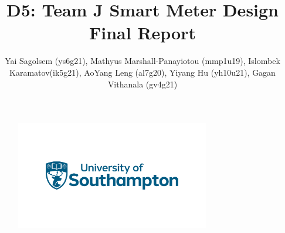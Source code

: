 \documentclass[9pt, technote, a4paper, nofonttune]{IEEEphot}
\begin{document}
\title{D5: Team J Smart Meter Design Final Report}

\author{Yai Sagolsem (ys6g21), Mathyus Marshall-Panayiotou (mmp1u19), Islombek Karamatov(ik5g21), AoYang Leng (al7g20), Yiyang Hu (yh10u21), Gagan Vithanala (gv4g21)}

\maketitle
\vspace*{-96pt}
\begin{figure}[h!]
    \centering
    \includegraphics[width=20pc]{D5/University symbol.png}
\end{figure}\vspace*{-48pt}
\begin{receivedinfo}%
\end{receivedinfo}
\begin{center}
\tableofcontents
\end{center}
\vspace*{24pt}
\end{document}
